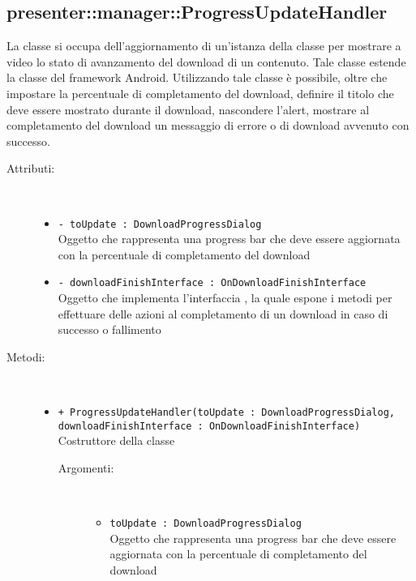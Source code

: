 \documentclass[../Tesi.tex]{subfiles}
\begin{document}
		\subsection{presenter::manager::ProgressUpdateHandler}
		La classe  si occupa dell'aggiornamento di un'istanza della classe  per mostrare a video lo stato di avanzamento del download di un contenuto. Tale classe estende la classe  del framework Android. Utilizzando tale classe è possibile, oltre che impostare la percentuale di completamento del download, definire il titolo che deve essere mostrato durante il download, nascondere l'alert, mostrare al completamento del download un messaggio di errore o di download avvenuto con successo.
		\begin{description}
			\item[Attributi:] \
			\begin{itemize}
				\item \texttt{- toUpdate : DownloadProgressDialog}\\
				Oggetto che rappresenta una progress bar che deve essere aggiornata con la percentuale di completamento del download

				\item \texttt{- downloadFinishInterface : OnDownloadFinishInterface}\\
				Oggetto che implementa l'interfaccia , la quale espone i metodi per effettuare delle azioni al completamento di un download in caso di successo o fallimento
			\end{itemize}

			\item[Metodi:] \
			\begin{itemize}
				\item \texttt{+ ProgressUpdateHandler(toUpdate : DownloadProgressDialog,\\
                                 downloadFinishInterface : OnDownloadFinishInterface)}\\
				Costruttore della classe \mclass{ProgressUpdateHandler}
				\begin{description}
					\item[Argomenti:] \
					\begin{itemize}
						\item \texttt{toUpdate : DownloadProgressDialog}\\
						Oggetto che rappresenta una progress bar che deve essere aggiornata con la percentuale di completamento del download


\end{itemize}
\end{description}
\end{itemize}
\end{description}
\end{document}
